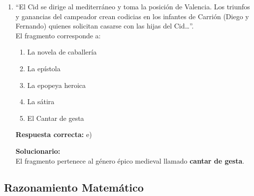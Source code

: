 \begin{enumerate}
	\vspace{2mm}
	\textbf{Solucionario:}\\
	“Rumi Ñawi” significa \textbf{ojos de piedra}.
	
	\vspace{6mm}
	
	\item “El Cid se dirige al mediterráneo y toma la posición de Valencia. Los triunfos y ganancias del campeador crean codicias en los infantes de Carrión (Diego y Fernando) quienes solicitan casarse con las hijas del Cid…”.\\
	El fragmento corresponde a:
	\begin{enumerate}[label=\alph*)]
		\item La novela de caballería
		\item La epístola
		\item La epopeya heroica
		\item La sátira
		\item El Cantar de gesta
	\end{enumerate}
	\textbf{Respuesta correcta:} e)
	
	\vspace{2mm}
	\textbf{Solucionario:}\\
	El fragmento pertenece al género épico medieval llamado \textbf{cantar de gesta}.
	
	\vspace{6mm}
	
\end{enumerate}


\subsection*{Razonamiento Matemático}

